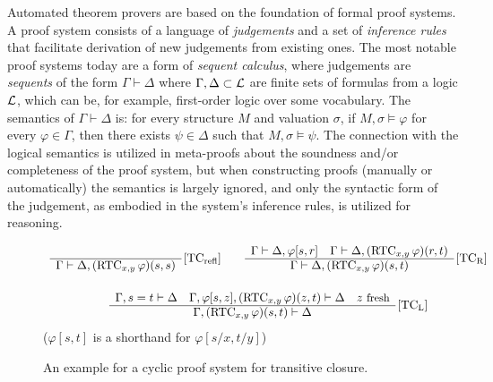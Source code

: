 Automated theorem provers are based on the foundation of formal proof systems.
A proof system consists of a language of \emph{judgements} and a set of \emph{inference rules} that facilitate derivation of new judgements from existing ones.
The most notable proof systems today are a form of \emph{sequent calculus}, where judgements are \emph{sequents} of the form $\Gamma \vdash \Delta$ where $\Gamma,\Delta \subset \mathcal{L}$ are finite sets of formulas from a logic $\mathcal{L}$, which can be, for example, first-order logic over some vocabulary.
The semantics of $\Gamma\vdash\Delta$ is: for every structure $M$ and valuation $\sigma$, if $M,\sigma\models\varphi$ for every $\varphi\in\Gamma$, then there exists $\psi\in\Delta$ such that $M,\sigma\models\psi$.
The connection with the logical semantics is utilized in meta-proofs about the soundness and/or completeness of the proof system,
but when constructing proofs (manually or automatically) the semantics is largely ignored, and only the syntactic form of the judgement, as embodied in the system's inference rules,
is utilized for reasoning.

\begin{figure}
\centering
\renewcommand\arraystretch{1.2}
\[
\begin{array}{c@{\qquad}c}
\begin{array}{c}
~ \\ \hline
\Gamma \vdash \Delta, \RTC{x,y}{\varphi}{s,s}
\end{array}
\,\rulename{TC$_\textrm{refl}$}
%
&
\begin{array}{c}
\Gamma \vdash \Delta, \varphi[s,r] \quad
\Gamma \vdash \Delta, \RTC{x,y}{\varphi}{r,t} \\ \hline
\Gamma \vdash \Delta, \RTC{x,y}{\varphi}{s,t}
\end{array}
\,\rulename{TC$_\textrm{R}$}
\\[5ex]
\multicolumn{2}{c}{
\begin{array}{c}
\Gamma, s = t \vdash \Delta \quad
\Gamma,\varphi[s,z], \RTC{x,y}{\varphi}{z,t} \vdash \Delta \quad
z~\textrm{\small fresh}
\\ \hline
\Gamma,\RTC{x,y}{\varphi}{s,t}
	\vdash \Delta
\end{array}
\,\rulename{TC$_\textrm{L}$}
}
\end{array}
\]
({\small $\varphi[s,t]$ is a shorthand for $\varphi[s/x,t/y]$})
\caption{An example for a cyclic proof system for transitive closure.}
\label{b2:tc-cyclic}
\end{figure}

